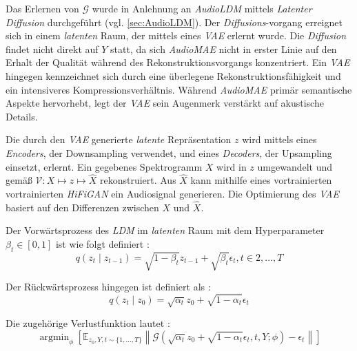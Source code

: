 \documentclass[
  a4paper,  %
  twoside,  %
  bibliography=totoc,
  headsepline,
  cleardoublepage=empty,
  parskip=half,
  draft=false
]{scrbook}
\begin{document}
Das Erlernen von $\mathcal{G}$ wurde in Anlehnung an \emph{AudioLDM} \cite{liu_audioldm_2023} mittels \emph{Latenter Diffusion} \cite{rombach_high-resolution_2022} durchgeführt (vgl. \ref{sec:AudioLDM}). Der \emph{Diffusions}-vorgang erreignet sich in einem \emph{latenten} Raum, der mittels eines \emph{VAE} \cite{kingma_auto-encoding_2022} erlernt wurde. Die \emph{Diffusion} findet nicht direkt auf $Y$ statt, da sich \emph{AudioMAE} nicht in erster Linie auf den Erhalt der Qualität während des Rekonstruktionsvorgangs konzentriert. Ein \emph{VAE} hingegen kennzeichnet sich durch eine überlegene Rekonstruktionsfähigkeit und ein intensiveres Kompressionsverhältnis. Während \emph{AudioMAE} primär semantische Aspekte hervorhebt, legt der \emph{VAE} sein Augenmerk verstärkt auf akustische Details. \cite{liu_audioldm2_2023}

Die durch den \emph{VAE} generierte \emph{latente} Repräsentation $z$ wird mittels eines \emph{Encoders}, der Downsampling verwendet, und eines \emph{Decoders}, der Upsampling einsetzt, erlernt. Ein gegebenes Spektrogramm $X$ wird in $z$ umgewandelt und gemäß $\mathcal{V}: X \mapsto z \mapsto \hat{X}$ rekonstruiert. Aus $\hat{X}$ kann mithilfe eines vortrainierten vortrainierten \emph{HiFiGAN} \cite{kong_hifi-gan_2020} ein Audiosignal generieren. Die Optimierung des \emph{VAE} basiert auf den Differenzen zwischen $X$ und $\hat{X}$. \cite{liu_audioldm2_2023}

Der Vorwärtsprozess des \emph{LDM} im \emph{latenten} Raum mit dem Hyperparameter $\beta_t \in[0,1]$ ist wie folgt definiert \cite{liu_audioldm2_2023}:
\begin{equation}
    q\left(z_t \mid z_{t-1}\right)=\sqrt{1-\beta_t} z_{t-1}+\sqrt{\beta_t} \epsilon_t, t \in 2, \ldots, T
\end{equation}

Der Rückwärtsprozess hingegen ist definiert als \cite{liu_audioldm2_2023}:
\begin{equation}
q\left(z_t \mid z_0\right)=\sqrt{\alpha_t} z_0+\sqrt{1-\alpha_t} \epsilon_t
\end{equation}

Die zugehörige Verlustfunktion lautet \cite{liu_audioldm2_2023}:
\begin{equation}
\operatorname{argmin}_\phi\left[\mathbb{E}_{z_0, Y, t \sim\{1, \ldots, T\}}\left\|\mathcal{G}\left(\sqrt{\alpha_t} z_0+\sqrt{1-\alpha_t} \epsilon_t, t, Y ; \phi\right)-\epsilon_t\right\|\right]
\end{equation}
\end{document}

